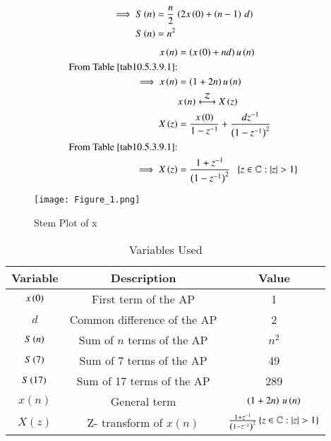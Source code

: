 \documentclass[journal,12pt,twocolumn]{IEEEtran}
\theoremstyle{remark}
\begin{document}
\begin{align}
    \implies S\left(n\right)&= \frac{n}{2}\,\left(2x\left(0\right)+\left(n-1\right)\,d\right)\label{eq10.5.3.9.4}\\
    S\left(n\right)&=n^2\label{eq10.5.3.9.5}
\end{align}
\begin{align}
    x\brak{n}&=\brak{x\brak{0}+nd}u\brak{n}\\
    \text{From \tabref{tab10.5.3.9.1}:}\notag\\
    \implies x\brak{n}&= \brak{1+2n}u\brak{n}\\
    &x\brak{n}\system{Z}X\brak{z}\notag\\
    X\brak{z}&=\frac{x\brak{0}}{1-z^{-1}}+\frac{dz^{-1}}{\brak{1-z^{-1}}^2}\\
    \text{From \tabref{tab10.5.3.9.1}:}\notag\\
    \implies X\brak{z}&=\frac{1+z^{-1}}{\brak{1-z^{-1}}^2} \;\;\cbrak{z\in\mathbb{C}: |z|>1}
\end{align}
\begin{figure}[h]
    \centering
    \texttt{[image: Figure\_1.png]}
    \caption{Stem Plot of x}
    \label{stemplot}
\end{figure}
 \begin{table}[h]
    \centering
    \begin{tabular}[12pt]{ |c| c| c|}
    \hline
    \textbf{Variable} & \textbf{Description} &\textbf{Value}\\ 
    \hline
    $x\left(0\right)$ & First term of the AP &1\\
    \hline 
    $d$ & Common difference of the AP& 2\\
    \hline
    $S\left(n\right)$ & Sum of $n$ terms of the AP& $n^2$\\
    \hline
    $S\left(7\right)$& Sum of 7 terms of the AP& 49\\
    \hline
    $S\left(17\right)$& Sum of 17 terms of the AP&289\\
    \hline
    $x(n)$ & General term& $\left(1+2n\right)\,u\left(n\right)$\\
    \hline
    $X(z)$ & Z- transform of $x(n)$& $\frac{1+z^{-1}}{\brak{1-z^{-1}}^2} \cbrak{z\in\mathbb{C}: |z|>1}$\\
    \hline    
    \end{tabular}
    \caption{Variables Used}
    \label{tab10.5.3.9.1}
\end{table}
\end{document}

